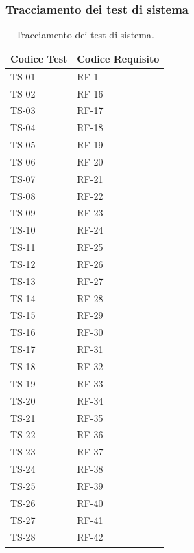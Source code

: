 \documentclass[8pt]{article}
\begin{document}
\subsubsection{Tracciamento dei test di sistema}
\renewcommand{\arraystretch}{2.5}
\begin{longtable}{|>{\centering}p{4cm}|>{\centering\arraybackslash}p{4cm}|}
\hline
\rowcolor{white}
\textbf{Codice Test} & \textbf{Codice Requisito} \\
\hline
\endfirsthead
\rowcolor{white}
\caption{Tracciamento dei test di sistema.}
\label{table:Tracciamento dei test di sistema}
\endlastfoot
    TS-01 & RF-1 \\
    \hline
    TS-02 & RF-16 \\
    \hline 
    TS-03 & RF-17 \\
    \hline
    TS-04 & RF-18 \\
    \hline
    TS-05 & RF-19 \\
    \hline
    TS-06 & RF-20 \\
    \hline
    TS-07 & RF-21 \\
    \hline
    TS-08 & RF-22 \\
    \hline
    TS-09 & RF-23 \\
    \hline
    TS-10 & RF-24 \\
    \hline
    TS-11 & RF-25 \\
    \hline
    TS-12 & RF-26 \\
    \hline
    TS-13 & RF-27 \\
    \hline
    TS-14 & RF-28 \\
    \hline
    TS-15 & RF-29 \\
    \hline
    TS-16 & RF-30 \\
    \hline
    TS-17 & RF-31 \\
    \hline
    TS-18 & RF-32 \\
    \hline
    TS-19 & RF-33 \\
    \hline
    TS-20 & RF-34 \\
    \hline
    TS-21 & RF-35 \\
    \hline
    TS-22 & RF-36 \\
    \hline
    TS-23 & RF-37 \\
    \hline
    TS-24 & RF-38 \\
    \hline
    TS-25 & RF-39 \\
    \hline
    TS-26 & RF-40 \\
    \hline
    TS-27 & RF-41 \\
    \hline
    TS-28 & RF-42 \\

\end{longtable}
\end{document}
